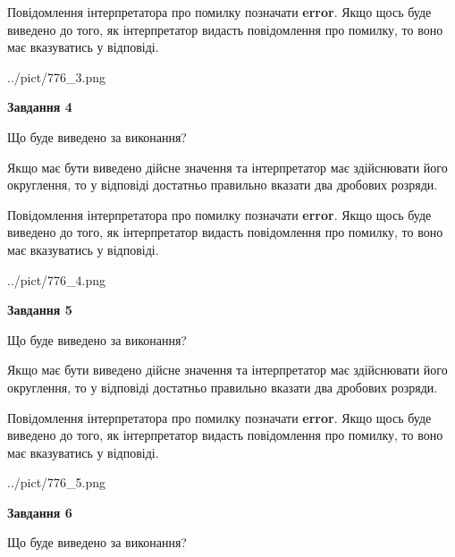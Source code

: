 \documentclass[12pt, ukrainian]{article}
\begin{document}
{\begin {Large}
Повідомлення інтерпретатора про помилку позначати \textbf{error}.
Якщо щось буде виведено до того, як інтерпретатор видасть повідомлення про помилку, 
то воно має вказуватись у відповіді. \par

\begin{center}
	{../pict/776_3.png}
\end{center}
\newpage

{\begin {center}\textbf{Завдання 4}\end {center}}\par
Що буде виведено за виконання? \par

Якщо має бути виведено дійсне значення та інтерпретатор має здійснювати його округлення, 
то у відповіді достатньо правильно вказати два дробових розряди.

Повідомлення інтерпретатора про помилку позначати \textbf{error}.
Якщо щось буде виведено до того, як інтерпретатор видасть повідомлення про помилку, 
то воно має вказуватись у відповіді. \par

\begin{center}
	{../pict/776_4.png}
\end{center}
\newpage

{\begin {center}\textbf{Завдання 5}\end {center}}\par
Що буде виведено за виконання? \par

Якщо має бути виведено дійсне значення та інтерпретатор має здійснювати його округлення, 
то у відповіді достатньо правильно вказати два дробових розряди.

Повідомлення інтерпретатора про помилку позначати \textbf{error}.
Якщо щось буде виведено до того, як інтерпретатор видасть повідомлення про помилку, 
то воно має вказуватись у відповіді. \par

\begin{center}
	{../pict/776_5.png}
\end{center}
\newpage

{\begin {center}\textbf{Завдання 6}\end {center}}\par
Що буде виведено за виконання? \par


\end{Large}}
\end{document}
